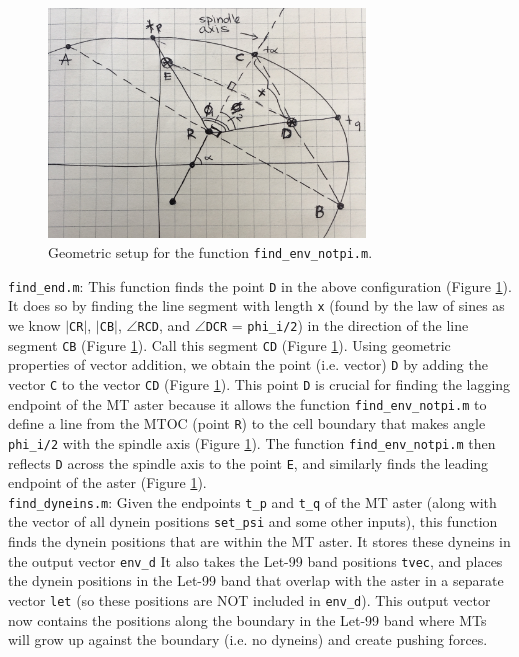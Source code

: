 \documentclass{article}
\begin{document}
\begin{figure}[H]
\centering
\includegraphics[width=0.75\textwidth]{figures/envNotPi.jpg}
\caption{Geometric setup for the function \texttt{find\_env\_notpi.m}.}
\label{envNotPi}
\end{figure}

\noindent\texttt{find\_end.m}: This function finds the point \texttt{D} in the above configuration (Figure \ref{envNotPi}). It does so by finding the line segment with length \texttt{x} (found by the law of sines as we know $|$\texttt{CR}$|$, $|$\texttt{CB}$|$, $\angle$\texttt{RCD}, and $\angle$\texttt{DCR} = \texttt{phi\_i/2}) in the direction of the line segment \texttt{CB} (Figure \ref{envNotPi}). Call this segment \texttt{CD} (Figure \ref{envNotPi}). Using geometric properties of vector addition, we obtain the point (i.e. vector) \texttt{D} by adding the vector \texttt{C} to the vector \texttt{CD} (Figure \ref{envNotPi}). This point \texttt{D} is crucial for finding the lagging endpoint of the MT aster because it allows the function \texttt{find\_env\_notpi.m} to define a line from the MTOC (point \texttt{R}) to the cell boundary that makes angle \texttt{phi\_i/2} with the spindle axis (Figure \ref{envNotPi}). The function \texttt{find\_env\_notpi.m} then reflects \texttt{D} across the spindle axis to the point \texttt{E}, and similarly finds the leading endpoint of the aster (Figure \ref{envNotPi}).
\\[3pt]

\noindent\texttt{find\_dyneins.m}: Given the endpoints \texttt{t\_p} and \texttt{t\_q} of the MT aster (along with the vector of all dynein positions \texttt{set\_psi} and some other inputs), this function finds the dynein positions that are within the MT aster. It stores these dyneins in the output vector \texttt{env\_d} It also takes the Let-99 band positions \texttt{tvec}, and places the dynein positions in the Let-99 band that overlap with the aster in a separate vector \texttt{let} (so these positions are NOT included in \texttt{env\_d}). This output vector now contains the positions along the boundary in the Let-99 band where MTs will grow up against the boundary (i.e. no dyneins) and create pushing forces.
\\[3pt]
\end{document}
